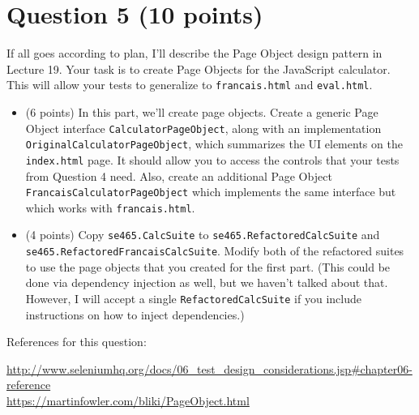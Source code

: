 \documentclass[10pt,hidelinks]{article}
\begin{document}

\section*{Question 5 (10 points)}

If all goes according to plan, I'll describe the Page Object design pattern in Lecture 19. Your task is to create Page Objects for the JavaScript calculator. This will allow your tests to generalize to {\tt francais.html} and
{\tt eval.html}.

\begin{itemize}
\item (6 points) In this part, we'll create page objects. Create a generic Page Object interface {\tt CalculatorPageObject}, along with an implementation {\tt OriginalCalculatorPageObject}, which summarizes the UI elements on the {\tt index.html} page. It should allow you to access the controls that your tests from Question 4 need. Also, create an additional Page Object {\tt FrancaisCalculatorPageObject} which implements the same interface but which works with {\tt francais.html}. 
  \item (4 points) Copy {\tt se465.CalcSuite} to {\tt se465.RefactoredCalcSuite} and {\tt se465.RefactoredFrancaisCalcSuite}. Modify both of the refactored suites to use the page objects that you created for the first part. (This could be done via dependency injection as well, but we haven't talked about that. However, I will accept a single {\tt RefactoredCalcSuite} if you include instructions on how to inject dependencies.)
\end{itemize}

References for this question:

\url{http://www.seleniumhq.org/docs/06_test_design_considerations.jsp#chapter06-reference}
\\
\url{https://martinfowler.com/bliki/PageObject.html}
\end{document}
